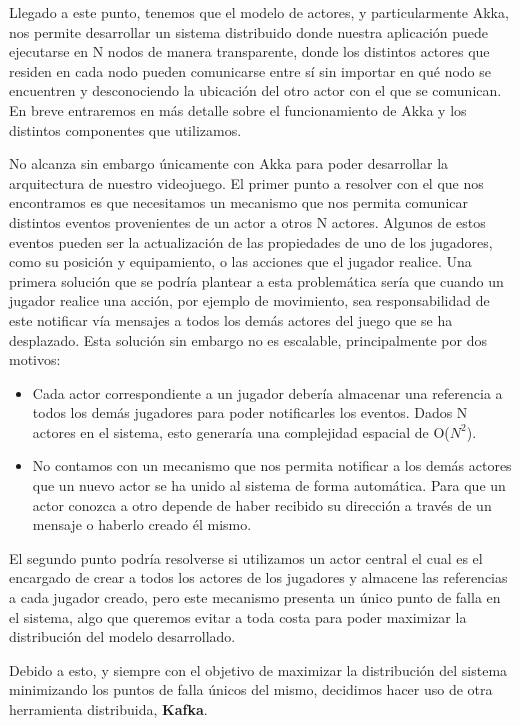 Llegado a este punto, tenemos que el modelo de actores, y particularmente Akka, nos permite desarrollar un sistema distribuido
donde nuestra aplicación puede ejecutarse en N nodos de manera transparente, donde los distintos actores que residen en cada nodo
pueden comunicarse entre sí sin importar en qué nodo se encuentren y desconociendo la ubicación del otro actor con el que se comunican.
En breve entraremos en más detalle sobre el funcionamiento de Akka y los distintos componentes que utilizamos.

No alcanza sin embargo únicamente con Akka para poder desarrollar la arquitectura de nuestro videojuego.
El primer punto a resolver con el que nos encontramos es que necesitamos un mecanismo que nos permita comunicar distintos eventos
provenientes de un actor a otros N actores. Algunos de estos eventos pueden ser la actualización de las propiedades de uno de los jugadores,
como su posición y equipamiento, o las acciones que el jugador realice. Una primera solución que se podría plantear a esta problemática sería que cuando un jugador realice una acción,
por ejemplo de movimiento, sea responsabilidad de este notificar vía mensajes a todos los demás actores del juego que se ha desplazado. Esta solución sin embargo no es escalable, principalmente por dos motivos:

\begin{itemize}
    \item Cada actor correspondiente a un jugador debería almacenar una referencia a todos los demás jugadores para poder notificarles los eventos.
    Dados N actores en el sistema, esto generaría una complejidad espacial de O($N^2$).
    \item No contamos con un mecanismo que nos permita notificar a los demás actores que un nuevo actor se ha unido al sistema de forma automática.
    Para que un actor conozca a otro depende de haber recibido su dirección a través de un mensaje o haberlo creado él mismo.
\end{itemize}

El segundo punto podría resolverse si utilizamos un actor central el cual es el encargado de crear a todos los actores de los jugadores
y almacene las referencias a cada jugador creado, pero este mecanismo presenta un único punto de falla en el sistema, algo que queremos evitar a toda costa
para poder maximizar la distribución del modelo desarrollado.

Debido a esto, y siempre con el objetivo de maximizar la distribución del sistema minimizando los puntos de falla únicos del mismo,
decidimos hacer uso de otra herramienta distribuida, \textbf{Kafka}.

